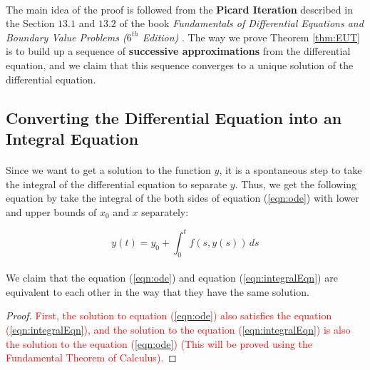 \documentclass{article}
\theoremstyle{definition}
\theoremstyle{remark}
\begin{document}
\paragraph{  }

The main idea of the proof is followed from the \textbf{Picard Iteration} described in the Section $13.1$ and $13.2$ of the book \textit{Fundamentals of Differential Equations and Boundary Value Problems ($6^{th}$ Edition)} \cite{r_kent_nagle_fundamentals_2011}. The way we prove Theorem \ref{thm:EUT} is to build up a sequence of \textbf{successive approximations} from the differential equation, and we claim that this sequence converges to a unique solution of the differential equation.

\subsection{Converting the Differential Equation into an Integral Equation}

\paragraph{  }

Since we want to get a solution to the function $y$, it is a spontaneous step to take the integral of the differential equation to separate $y$. Thus, we get the following equation by take the integral of the both sides of equation (\ref{eqn:ode}) with lower and upper bounds of $x_0$ and $x$ separately:

\begin{equation}\label{eqn:integralEqn}
    y(t) = y_0 + \int_{0}^{t} f(s,y(s))\,ds
\end{equation}

\paragraph{  }

We claim that the equation (\ref{eqn:ode}) and equation (\ref{eqn:integralEqn}) are equivalent to each other in the way that they have the same solution. 

\begin{proof}
    \textcolor{red}{First, the solution to equation (\ref{eqn:ode}) also satisfies the equation (\ref{eqn:integralEqn}), and the solution to the equation (\ref{eqn:integralEqn}) is also the solution to the equation (\ref{eqn:ode}) (This will be proved using the Fundamental Theorem of Calculus).}
\end{proof}
\end{document}
